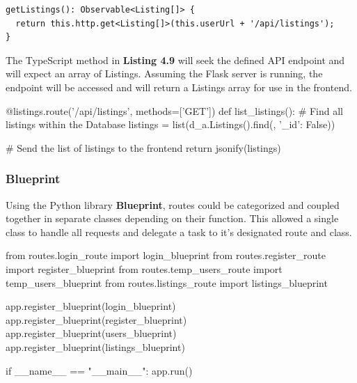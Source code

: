 \begin{lstlisting}[caption=Basic Request to the API]
getListings(): Observable<Listing[]> {
  return this.http.get<Listing[]>(this.userUrl + '/api/listings');
}
\end{lstlisting}

The TypeScript method in \textbf{Listing 4.9} will seek the defined API endpoint and will expect an array of Listings. Assuming the Flask server is running, the endpoint will be accessed and will return a Listings array for use in the frontend. \newline

\begin{python}[caption=API Counterpart Route]
@listings.route('/api/listings', methods=['GET'])
def list_listings():
    # Find all listings within the Database
    listings = list(d_a.Listings().find({}, {'_id': False}))
    
    # Send the list of listings to the frontend
    return jsonify(listings)
\end{python}

\subsubsection{Blueprint}
Using the Python library \textbf{Blueprint}, routes could be categorized and coupled together in separate classes depending on their function. This allowed a single class to handle all requests and delegate a task to it's designated route and class. \newline

\begin{python}[caption=Main Flask Runner]
from routes.login_route import login_blueprint 
from routes.register_route import register_blueprint
from routes.temp_users_route import temp_users_blueprint
from routes.listings_route import listings_blueprint

app.register_blueprint(login_blueprint) 
app.register_blueprint(register_blueprint)
app.register_blueprint(users_blueprint)
app.register_blueprint(listings_blueprint)

if __name__ == "__main__":
    app.run() 
\end{python}

